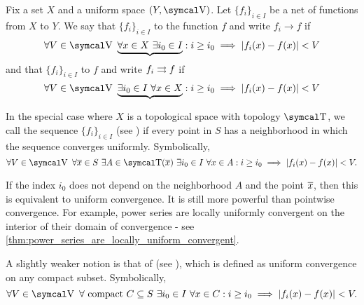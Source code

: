 \begin{definition}\label{def:function_net_convergence}
  Fix a set \( X \) and a uniform space \( (Y, \V) \). Let \( \{ f_i \}_{i \in I} \) be a net of functions from \( X \) to \( Y \). We say that \( \{ f_i \}_{i \in I} \)  to the function \( f \) and write \( f_i \to f \) if
  \begin{equation}\label{def:function_net_convergence/pointwise}
    \forall V \in \V \ \underbrace{\forall x \in X \ \exists i_0 \in I} : i \geq i_0 \implies \Abs{f_i(x) - f(x)} < V
  \end{equation}
  and that \( \{ f_i \}_{i \in I} \)  to \( f \) and write \( f_i \rightrightarrows f \) if
  \begin{equation}\label{def:function_net_convergence/uniform}
    \forall V \in \V \ \underbrace{\exists i_0 \in I \ \forall x \in X} : i \geq i_0 \implies \Abs{f_i(x) - f(x)} < V
  \end{equation}

  In the special case where \( X \) is a topological space with topology \( \T \), we call the sequence \( \{ f_i \}_{i \in I} \)  (see \cite{ProofWiki:locally_uniform_convergence}) if every point in \( S \) has a neighborhood in which the sequence converges uniformly. Symbolically,
  \begin{equation}\label{def:function_net_convergence/locally_uniform}
    \forall V \in \V \ \forall \Ol{x} \in S \ \exists A \in \T(\Ol{x}) \ \exists i_0 \in I \ \forall x \in A : i \geq i_0 \implies \Abs{f_i(x) - f(x)} < V.
  \end{equation}

  If the index \( i_0 \) does not depend on the neighborhood \( A \) and the point \( \overline{x} \), then this is equivalent to uniform convergence. It is still more powerful than pointwise convergence. For example, power series are locally uniformly convergent on the interior of their domain of convergence - see \cref{thm:power_series_are_locally_uniform_convergent}.

  A slightly weaker notion is that of  (see \cite{ProofWiki:compact_convergence}), which is defined as uniform convergence on any compact subset. Symbolically,
  \begin{equation}\label{def:function_net_convergence/compact}
    \forall V \in \V \ \forall \text{ compact } C \subseteq S \ \exists i_0 \in I \ \forall x \in C : i \geq i_0 \implies \Abs{f_i(x) - f(x)} < V.
  \end{equation}
\end{definition}

